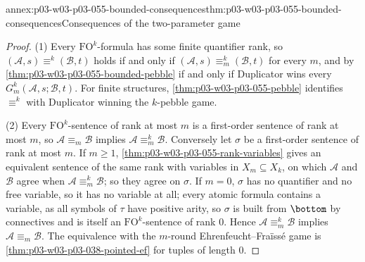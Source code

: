 \begin{annexitem}{annex:p03-w03-p03-055-bounded-consequences}{thm:p03-w03-p03-055-bounded-consequences}{Consequences of the two-parameter game}
\begin{proof}
(1) Every \(\mathrm{FO}^k\)-formula has some finite quantifier rank, so
\((\mathcal A,s)\equiv^k(\mathcal B,t)\) holds if and only if
\((\mathcal A,s)\equiv^k_m(\mathcal B,t)\) for every \(m\), and by
\cref{thm:p03-w03-p03-055-bounded-pebble} if and only if Duplicator wins
every \(G^k_m(\mathcal A,s;\mathcal B,t)\). For finite structures,
\cref{thm:p03-w03-p03-055-pebble} identifies \(\equiv^k\) with Duplicator
winning the \(k\)-pebble game.

(2) Every \(\mathrm{FO}^k\)-sentence of rank at most \(m\) is a first-order
sentence of rank at most \(m\), so \(\mathcal A\equiv_m\mathcal B\) implies
\(\mathcal A\equiv^k_m\mathcal B\). Conversely let \(\sigma\) be a
first-order sentence of rank at most \(m\). If \(m\ge1\),
\cref{thm:p03-w03-p03-055-rank-variables} gives an equivalent sentence of the
same rank with variables in \(X_m\subseteq X_k\), on which
\(\mathcal A\) and \(\mathcal B\) agree when
\(\mathcal A\equiv^k_m\mathcal B\); so they agree on \(\sigma\). If
\(m=0\), \(\sigma\) has no quantifier and no free variable, so it has no
variable at all; every atomic formula contains a variable, as all symbols
of \(\tau\) have positive arity, so \(\sigma\) is built from \(\bottom\) by
connectives and is itself an \(\mathrm{FO}^k\)-sentence of rank \(0\). Hence
\(\mathcal A\equiv^k_m\mathcal B\) implies \(\mathcal A\equiv_m\mathcal B\).
The equivalence with the \(m\)-round Ehrenfeucht--Fra\"iss\'e game is
\cref{thm:p03-w03-p03-038-pointed-ef} for tuples of length \(0\).


\end{proof}
\end{annexitem}
